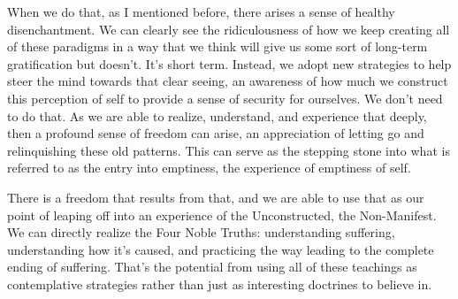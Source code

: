 When we do that, as I mentioned before, there arises a sense of healthy disenchantment. We can clearly see the ridiculousness of how we keep creating all of these paradigms in a way that we think will give us some sort of long-term gratification but doesn't. It's short term. Instead, we adopt new strategies to help steer the mind towards that clear seeing, an awareness of how much we construct this perception of self to provide a sense of security for ourselves. We don't need to do that. As we are able to realize, understand, and experience that deeply, then a profound sense of freedom can arise, an appreciation of letting go and relinquishing these old patterns. This can serve as the stepping stone into what is referred to as the entry into emptiness, the experience of emptiness of self.

\enlargethispage{1\baselineskip}
There is a freedom that results from that, and we are able to use that as our point of leaping off into an experience of the Unconstructed, the Non-Manifest. We can directly realize the Four Noble Truths: understanding suffering, understanding how it's caused, and practicing the way leading to the complete ending of suffering. That's the potential from using all of these teachings as contemplative strategies rather than just as interesting doctrines to believe in.
